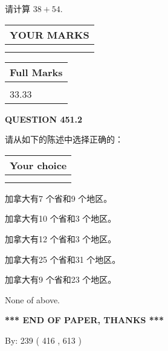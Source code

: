 \documentclass{ctexart}
\begin{document}
  
 
请计算 $ %
38 +  %
54 $.
 

 

 
  
\vspace{0.2in}
  
\noindent\begin{tabular}{|l|}
\hline
 YOUR MARKS  \\
\hline
 \\ 
 \\ 
\hline
\end{tabular}
\hspace{0.05in} \begin{tabular}{|l|}
\hline
 Full Marks  \\
\hline
 \\ 
33.33 \\
\hline
\end{tabular}
{\textbf{\Large{QUESTION
451.2 
}}}
  
  
请从如下的陈述中选择正确的：
  
  
\noindent\hspace{3.0in} \begin{tabular}{|l|}
\hline
Your choice \\
\hline
 \\ 
 \\ 
\hline
\end{tabular}
  
  
 
 
加拿大有7 个省和9 个地区。
 
 
加拿大有10 个省和3 个地区。
 
 
加拿大有12 个省和3 个地区。
 
 
加拿大有25 个省和31 个地区。
 
 
加拿大有9 个省和23 个地区。
 
 
 None of above.
 
 
   
   
 \vspace{0.2in}
 
   
   
   
   
\vspace{1.0in} 
{\textbf{\large{ *** END OF PAPER, THANKS *** }}} 
   
   
\hspace{1.0in} By: 
 239 ( 416 ,  613 )
   
\end{document}

